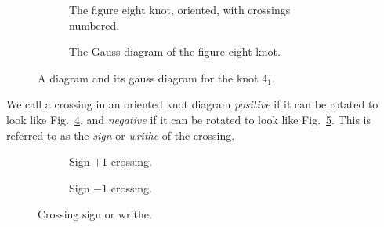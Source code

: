 \documentclass[12pt]{report}
\theoremstyle{upright}
\begin{document}
\begin{figure}[ht]
	\centering
	\hspace*{\fill}
	\begin{subfigure}[b]{0.4 \textwidth}
		\centering
		\def\svgscale{0.25}
		
		
		\caption{The figure eight knot, oriented, with crossings numbered.}
		\label{fig:figure-eight-diagram}
	\end{subfigure}
	\hspace*{\fill} \hspace*{\fill}	\hspace*{\fill}
	\begin{subfigure}[b]{0.4 \textwidth}
		\centering
		\def\svgscale{1.2}
		
		
		\caption{The Gauss diagram of the figure eight knot.}
		\label{fig:gauss_diagram_figure_eight}
	\end{subfigure}
	\hspace*{\fill} 
	\caption{A diagram and its gauss diagram for the knot $4_{1}$.}
	\label{fig:figure-eight}
\end{figure}

We call a crossing in an oriented knot diagram \textit{positive} if it can be rotated to look like Fig.~\ref{fig:cross_pos}, and \textit{negative} if it can be rotated to look like Fig.~\ref{fig:cross_neg}. This is referred to as the \textit{sign} or \textit{writhe} of the crossing.

\begin{figure}[hbt]
	\centering
	\hspace*{\fill}
	\begin{subfigure}[b]{0.4 \textwidth}
		\centering
		\def\svgscale{0.28}
		
		\caption{Sign $+1$ crossing.}
		\label{fig:cross_pos}
	\end{subfigure}
	\hspace*{\fill} \hspace*{\fill}	\hspace*{\fill}
	\begin{subfigure}[b]{0.4 \textwidth}
		\centering
		\def\svgscale{0.28}
		
		\caption{Sign $-1$ crossing.}
		\label{fig:cross_neg}
	\end{subfigure}
	\hspace*{\fill} 
	\caption{Crossing sign or writhe.}
	\label{fig:crossing-sign}
\end{figure}
\end{document}
